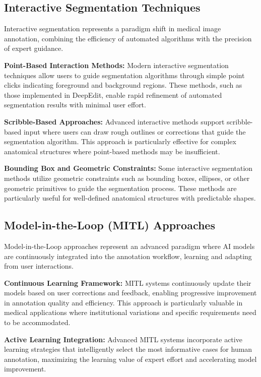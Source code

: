 \subsection{Interactive Segmentation Techniques}

Interactive segmentation represents a paradigm shift in medical image annotation, combining the efficiency of automated algorithms with the precision of expert guidance.

\textbf{Point-Based Interaction Methods:} Modern interactive segmentation techniques allow users to guide segmentation algorithms through simple point clicks indicating foreground and background regions. These methods, such as those implemented in DeepEdit, enable rapid refinement of automated segmentation results with minimal user effort.

\textbf{Scribble-Based Approaches:} Advanced interactive methods support scribble-based input where users can draw rough outlines or corrections that guide the segmentation algorithm. This approach is particularly effective for complex anatomical structures where point-based methods may be insufficient.

\textbf{Bounding Box and Geometric Constraints:} Some interactive segmentation methods utilize geometric constraints such as bounding boxes, ellipses, or other geometric primitives to guide the segmentation process. These methods are particularly useful for well-defined anatomical structures with predictable shapes.

\subsection{Model-in-the-Loop (MITL) Approaches}

Model-in-the-Loop approaches represent an advanced paradigm where AI models are continuously integrated into the annotation workflow, learning and adapting from user interactions.

\textbf{Continuous Learning Framework:} MITL systems continuously update their models based on user corrections and feedback, enabling progressive improvement in annotation quality and efficiency. This approach is particularly valuable in medical applications where institutional variations and specific requirements need to be accommodated.

\textbf{Active Learning Integration:} Advanced MITL systems incorporate active learning strategies that intelligently select the most informative cases for human annotation, maximizing the learning value of expert effort and accelerating model improvement.

